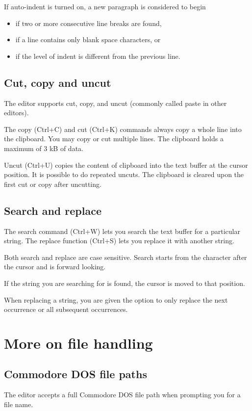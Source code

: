 \documentclass{article}
\begin{document}
        If auto-indent is turned on, a new paragraph is considered to begin

        \begin{itemize}
            \item if two or more consecutive line breaks are found, 
            \item if a line contains only blank space characters, or
            \item if the level of indent is different from the previous line.
        \end{itemize}

    \subsection{Cut, copy and uncut}
        The editor supports cut, copy, and uncut (commonly called paste in other editors).

        The copy (Ctrl+C) and cut (Ctrl+K) commands always copy a whole line into the clipboard. You may
        copy or cut multiple lines. The clipboard holds a maximum of 3 kB of data.

        Uncut (Ctrl+U) copies the content of clipboard into the text buffer at the cursor position. It is possible
        to do repeated uncuts. The clipboard is cleared upon the first cut or copy after uncutting.

    \subsection{Search and replace}
        The search command (Ctrl+W) lets you search the text buffer for
        a particular string. The replace function (Ctrl+S)
        lets you replace it with another string.

        Both search and replace are case sensitive. Search starts from the character after the cursor
        and is forward looking.

        If the string you are searching for is found, the cursor is moved to that position.

        When replacing a string, you are given the option to only replace the
        next occurrence or all subsequent occurrences.

\section{More on file handling}
    \subsection{Commodore DOS file paths}
    The editor accepts a full Commodore DOS file path when prompting you for a file name.
\end{document}
